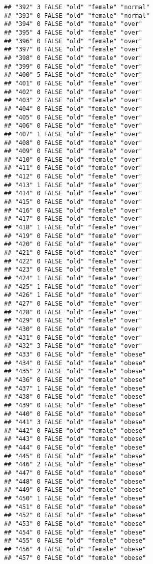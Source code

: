 \documentclass[]{article}
\begin{document}
\begin{verbatim}
## "392" 3 FALSE "old" "female" "normal"
## "393" 0 FALSE "old" "female" "normal"
## "394" 0 FALSE "old" "female" "over"
## "395" 4 FALSE "old" "female" "over"
## "396" 0 FALSE "old" "female" "over"
## "397" 0 FALSE "old" "female" "over"
## "398" 0 FALSE "old" "female" "over"
## "399" 0 FALSE "old" "female" "over"
## "400" 5 FALSE "old" "female" "over"
## "401" 0 FALSE "old" "female" "over"
## "402" 0 FALSE "old" "female" "over"
## "403" 2 FALSE "old" "female" "over"
## "404" 0 FALSE "old" "female" "over"
## "405" 0 FALSE "old" "female" "over"
## "406" 0 FALSE "old" "female" "over"
## "407" 1 FALSE "old" "female" "over"
## "408" 0 FALSE "old" "female" "over"
## "409" 0 FALSE "old" "female" "over"
## "410" 0 FALSE "old" "female" "over"
## "411" 0 FALSE "old" "female" "over"
## "412" 0 FALSE "old" "female" "over"
## "413" 1 FALSE "old" "female" "over"
## "414" 0 FALSE "old" "female" "over"
## "415" 0 FALSE "old" "female" "over"
## "416" 0 FALSE "old" "female" "over"
## "417" 0 FALSE "old" "female" "over"
## "418" 1 FALSE "old" "female" "over"
## "419" 0 FALSE "old" "female" "over"
## "420" 0 FALSE "old" "female" "over"
## "421" 0 FALSE "old" "female" "over"
## "422" 0 FALSE "old" "female" "over"
## "423" 0 FALSE "old" "female" "over"
## "424" 1 FALSE "old" "female" "over"
## "425" 1 FALSE "old" "female" "over"
## "426" 1 FALSE "old" "female" "over"
## "427" 0 FALSE "old" "female" "over"
## "428" 0 FALSE "old" "female" "over"
## "429" 0 FALSE "old" "female" "over"
## "430" 0 FALSE "old" "female" "over"
## "431" 0 FALSE "old" "female" "over"
## "432" 3 FALSE "old" "female" "over"
## "433" 0 FALSE "old" "female" "obese"
## "434" 0 FALSE "old" "female" "obese"
## "435" 2 FALSE "old" "female" "obese"
## "436" 0 FALSE "old" "female" "obese"
## "437" 1 FALSE "old" "female" "obese"
## "438" 0 FALSE "old" "female" "obese"
## "439" 0 FALSE "old" "female" "obese"
## "440" 0 FALSE "old" "female" "obese"
## "441" 3 FALSE "old" "female" "obese"
## "442" 0 FALSE "old" "female" "obese"
## "443" 0 FALSE "old" "female" "obese"
## "444" 0 FALSE "old" "female" "obese"
## "445" 0 FALSE "old" "female" "obese"
## "446" 2 FALSE "old" "female" "obese"
## "447" 0 FALSE "old" "female" "obese"
## "448" 0 FALSE "old" "female" "obese"
## "449" 0 FALSE "old" "female" "obese"
## "450" 1 FALSE "old" "female" "obese"
## "451" 0 FALSE "old" "female" "obese"
## "452" 0 FALSE "old" "female" "obese"
## "453" 0 FALSE "old" "female" "obese"
## "454" 0 FALSE "old" "female" "obese"
## "455" 0 FALSE "old" "female" "obese"
## "456" 4 FALSE "old" "female" "obese"
## "457" 0 FALSE "old" "female" "obese"

\end{verbatim}
\end{document}
